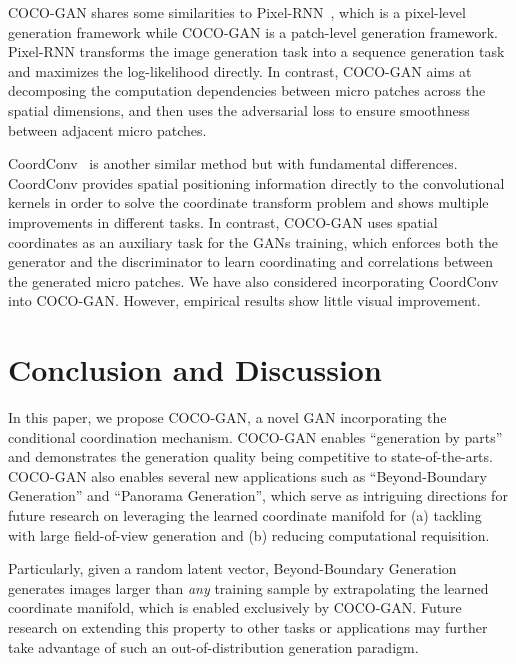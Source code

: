 \documentclass{article}
\newcommand{\modelName}{COCO-GAN }
\newcommand{\modelNamePunc}{COCO-GAN}
\begin{document}
    \modelName shares some similarities to Pixel-RNN~\cite{pixel-rnn}, which is a pixel-level generation framework while \modelName is a patch-level generation framework. Pixel-RNN transforms the image generation task into a sequence generation task and maximizes the log-likelihood directly. In contrast, \modelName aims at decomposing the computation dependencies between micro patches across the spatial dimensions, and then uses the adversarial loss to ensure smoothness between adjacent micro patches.
    
    CoordConv~\cite{coord-conv} is another similar method but with fundamental differences. CoordConv provides spatial positioning information directly to the convolutional kernels in order to solve the coordinate transform problem and shows multiple improvements in different tasks. In contrast, \modelName uses spatial coordinates as an auxiliary task for the GANs training, which enforces both the generator and the discriminator to learn coordinating and correlations between the generated micro patches. We have also considered incorporating CoordConv into \modelNamePunc. However, empirical results show little visual improvement.
    




     \section{Conclusion and Discussion}

    In this paper, we propose \modelNamePunc, a novel GAN incorporating the conditional coordination mechanism. \modelName enables ``generation by parts'' and demonstrates the generation quality being competitive to state-of-the-arts. \modelName also enables several new applications such as ``Beyond-Boundary Generation'' and ``Panorama Generation'', which serve as intriguing directions for future research on leveraging the learned coordinate manifold for (a) tackling with large field-of-view generation and (b) reducing computational requisition.
    




    Particularly, given a random latent vector, Beyond-Boundary Generation generates images larger than \textit{any} training sample by extrapolating the learned coordinate manifold, which is enabled exclusively by \modelNamePunc. Future research on extending this property to other tasks or applications may further take advantage of such an out-of-distribution generation paradigm.
\end{document}
